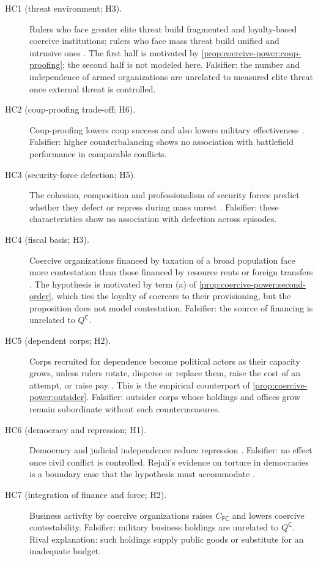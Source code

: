 \documentclass[11pt,letterpaper]{article}
\theoremstyle{definition}
\theoremstyle{remark}
\newcommand{\pF}{\mathsf{F}}
\newcommand{\pC}{\mathsf{C}}
\begin{document}
\begin{description}
\item[HC1 (threat environment; H3).] Rulers who face greater elite threat build fragmented and loyalty-based coercive institutions; rulers who face mass threat build unified and intrusive ones \citep{greitens2016}. The first half is motivated by \cref{prop:coercive-power:coup-proofing}; the second half is not modeled here. Falsifier: the number and independence of armed organizations are unrelated to measured elite threat once external threat is controlled.
\item[HC2 (coup-proofing trade-off; H6).] Coup-proofing lowers coup success and also lowers military effectiveness \citep{quinlivan1999,pilster2011}. Falsifier: higher counterbalancing shows no association with battlefield performance in comparable conflicts.
\item[HC3 (security-force defection; H5).] The cohesion, composition and professionalism of security forces predict whether they defect or repress during mass unrest \citep{bellin2012,albrecht2016,chenoweth2011}. Falsifier: these characteristics show no association with defection across episodes.
\item[HC4 (fiscal basis; H3).] Coercive organizations financed by taxation of a broad population face more contestation than those financed by resource rents or foreign transfers \citep{tilly1990,karaman2013}. The hypothesis is motivated by term (a) of \cref{prop:coercive-power:second-order}, which ties the loyalty of coercers to their provisioning, but the proposition does not model contestation. Falsifier: the source of financing is unrelated to $Q^{\pC}$.
\item[HC5 (dependent corps; H2).] Corps recruited for dependence become political actors as their capacity grows, unless rulers rotate, disperse or replace them, raise the cost of an attempt, or raise pay \citep{crone1980,pipes1981}. This is the empirical counterpart of \cref{prop:coercive-power:outsider}. Falsifier: outsider corps whose holdings and offices grow remain subordinate without such countermeasures.
\item[HC6 (democracy and repression; H1).] Democracy and judicial independence reduce repression \citep{poe1994,hill2014}. Falsifier: no effect once civil conflict is controlled. Rejali's evidence on torture in democracies is a boundary case that the hypothesis must accommodate \citep{rejali2007}.
\item[HC7 (integration of finance and force; H2).] Business activity by coercive organizations raises $C_{\pF\pC}$ and lowers coercive contestability. Falsifier: military business holdings are unrelated to $Q^{\pC}$. Rival explanation: such holdings supply public goods or substitute for an inadequate budget.

\end{description}
\end{document}
